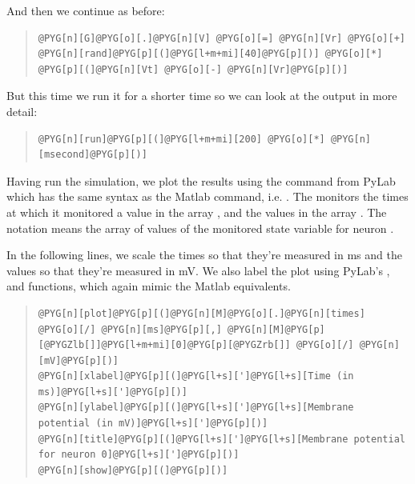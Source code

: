 \documentclass[letterpaper,10pt,english]{manual}
\begin{document}
And then we continue as before:
\begin{quote}

\begin{Verbatim}[commandchars=@\[\]]
@PYG[n][G]@PYG[o][.]@PYG[n][V] @PYG[o][=] @PYG[n][Vr] @PYG[o][+] @PYG[n][rand]@PYG[p][(]@PYG[l+m+mi][40]@PYG[p][)] @PYG[o][*] @PYG[p][(]@PYG[n][Vt] @PYG[o][-] @PYG[n][Vr]@PYG[p][)]
\end{Verbatim}
\end{quote}

But this time we run it for a shorter time so we can look at
the output in more detail:
\begin{quote}

\begin{Verbatim}[commandchars=@\[\]]
@PYG[n][run]@PYG[p][(]@PYG[l+m+mi][200] @PYG[o][*] @PYG[n][msecond]@PYG[p][)]
\end{Verbatim}
\end{quote}

Having run the simulation, we plot the results using the
 command from PyLab which has the same syntax as the Matlab
 command, i.e. . The \hyperlink{brian.StateMonitor}{}
monitors the times at which it monitored a value in the
array , and the values in the array . The notation
 means the array of values of the monitored state
variable for neuron .

In the following lines, we scale the times so that they're
measured in ms and the values so that they're measured in
mV. We also label the plot using PyLab's ,  and
 functions, which again mimic the Matlab equivalents.
\begin{quote}

\begin{Verbatim}[commandchars=@\[\]]
@PYG[n][plot]@PYG[p][(]@PYG[n][M]@PYG[o][.]@PYG[n][times] @PYG[o][/] @PYG[n][ms]@PYG[p][,] @PYG[n][M]@PYG[p][@PYGZlb[]]@PYG[l+m+mi][0]@PYG[p][@PYGZrb[]] @PYG[o][/] @PYG[n][mV]@PYG[p][)]
@PYG[n][xlabel]@PYG[p][(]@PYG[l+s][']@PYG[l+s][Time (in ms)]@PYG[l+s][']@PYG[p][)]
@PYG[n][ylabel]@PYG[p][(]@PYG[l+s][']@PYG[l+s][Membrane potential (in mV)]@PYG[l+s][']@PYG[p][)]
@PYG[n][title]@PYG[p][(]@PYG[l+s][']@PYG[l+s][Membrane potential for neuron 0]@PYG[l+s][']@PYG[p][)]
@PYG[n][show]@PYG[p][(]@PYG[p][)]
\end{Verbatim}
\end{quote}
\end{document}

